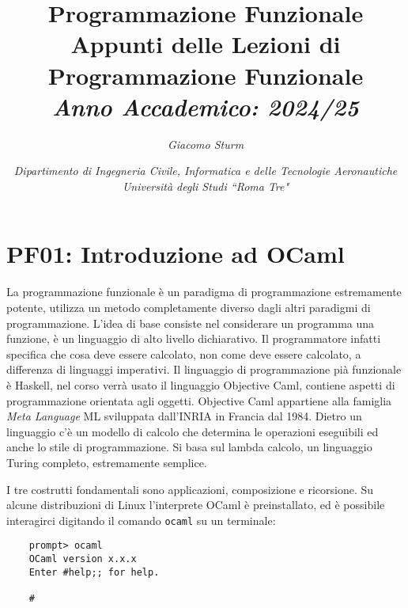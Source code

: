 \documentclass{article}
\numberwithin{equation}{subsection}
\begin{document}
\title{%
    \textbf{Programmazione Funzionale}  \\ 
    \large Appunti delle Lezioni di Programmazione Funzionale \\
    \textit{Anno Accademico: 2024/25}}
\author{\textit{Giacomo Sturm}}
\date{\textit{Dipartimento di Ingegneria Civile, Informatica e delle Tecnologie Aeronautiche \\
Università degli Studi ``Roma Tre"}}

\maketitle
\thispagestyle{link}

\clearpage


\pagestyle{fancy}
\fancyhead{}\fancyfoot{}
\fancyfoot[C]{\thepage}

\tableofcontents

\clearpage
{}


\section{PF01: Introduzione ad OCaml}

La programmazione funzionale è un paradigma di programmazione estremamente potente, utilizza un metodo completamente diverso dagli altri paradigmi di programmazione. L'idea di base consiste nel considerare un programma una funzione, è un linguaggio di alto livello dichiarativo. Il programmatore infatti specifica che cosa deve essere calcolato, non come deve essere calcolato, a differenza di linguaggi imperativi.  
Il linguaggio di programmazione pià funzionale è Haskell, nel corso verrà usato il linguaggio Objective Caml, contiene aspetti di programmazione orientata agli oggetti. 
Objective Caml appartiene alla famiglia \textit{Meta Language} ML sviluppata dall'INRIA in Francia dal 1984. 
Dietro un linguaggio c'è un modello di calcolo che determina le operazioni eseguibili ed anche lo stile di programmazione. 
Si basa sul lambda calcolo, un linguaggio Turing completo, estremamente semplice. 

I tre costrutti fondamentali sono applicazioni, composizione e ricorsione. Su alcune distribuzioni di Linux l'interprete OCaml è preinstallato, ed è possibile interagirci digitando il comando \verb|ocaml| su un terminale:
\begin{verbatim}
    prompt> ocaml
    OCaml version x.x.x
    Enter #help;; for help.

    #
\end{verbatim}
\end{document}
